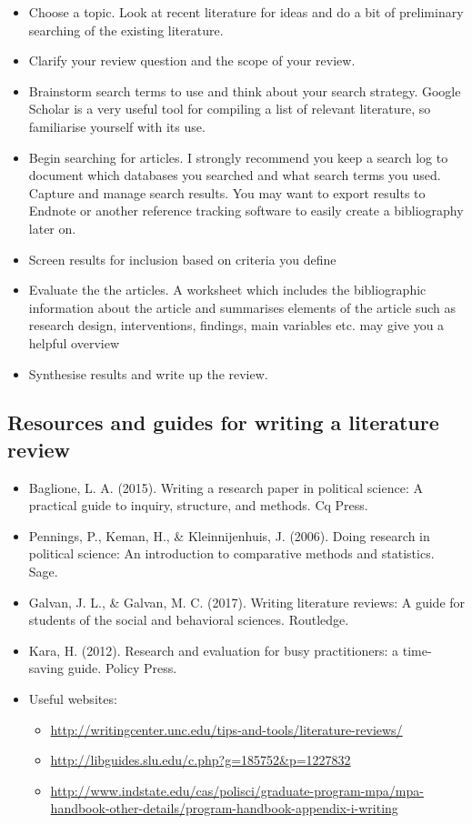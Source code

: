 \documentclass[a4paper,12pt]{article}
\begin{document}
\begin{itemize}
	\item Choose a topic. Look at recent literature for ideas and do a bit of preliminary searching of the existing literature.
	\item Clarify your review question and the scope of your review.
	\item Brainstorm search terms to use and think about your search strategy. Google Scholar is a very useful tool for compiling a list of relevant literature, so familiarise yourself with its use.
	\item Begin searching for articles. I strongly recommend you keep a search log to document which databases you searched and what search terms you used.
Capture and manage search results. You may want to export results to Endnote or another reference tracking software to easily create a bibliography later on.
	\item Screen results for inclusion based on criteria you define
	\item Evaluate the  the articles. A worksheet which includes the bibliographic information about the article and summarises elements of the article such as research design, interventions, findings, main variables etc. may give you a helpful overview
	\item Synthesise results and write up the review.
\end{itemize}

\subsection*{Resources and guides for writing a literature review}

\begin{itemize}
	\item Baglione, L. A. (2015). Writing a research paper in political science: A practical guide to inquiry, structure, and methods. Cq Press.
	\item Pennings, P., Keman, H., \& Kleinnijenhuis, J. (2006). Doing research in political science: An introduction to comparative methods and statistics. Sage.
	\item Galvan, J. L., \& Galvan, M. C. (2017). Writing literature reviews: A guide for students of the social and behavioral sciences. Routledge.
	\item Kara, H. (2012). Research and evaluation for busy practitioners: a time-saving guide. Policy Press.
	\item Useful websites:
	\begin{itemize}
		\item \url{http://writingcenter.unc.edu/tips-and-tools/literature-reviews/}
		\item \url{http://libguides.slu.edu/c.php?g=185752&p=1227832}
		\item  \url{http://www.indstate.edu/cas/polisci/graduate-program-mpa/mpa-handbook-other-details/program-handbook-appendix-i-writing}
	\end{itemize}
\end{itemize}
\end{document}
